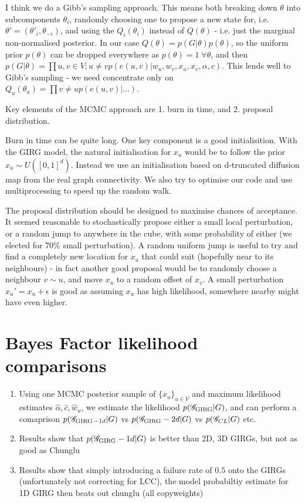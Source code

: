 I think we do a Gibb's sampling approach. This means both breaking down $\theta$ into subcomponents $\theta_i$, randomly choosing one to propose a new state for, i.e. $\theta' = (\theta'_i, \theta_{-i})$, and using the $Q_i(\theta_i)$ instead of $Q(\theta)$ - i.e. just the marginal non-normalised posterior. In our case $Q(\theta) = p(G | \theta) p(\theta)$, so the uniform prior $p(\theta)$ can be dropped everywhere as $p(\theta) = 1\; \forall \theta$, and then $p(G | \theta) = \prod{u, v \in V; u \neq v} p(e(u,v) | w_u, w_v, x_u, x_v, \alpha, c)$. This lends well to Gibb's sampling - we need concentrate only on $Q_u(\theta_u) = \prod{v \neq u} p(e(u,v) | ...)$.

Key elements of the MCMC approach are 1. burn in time, and 2. proposal distribution. 

Burn in time can be quite long. One key component is a good initialisition. With the GIRG model, the natural initialisation for $x_u$ would be to follow the prior $x_u \sim U([0, 1]^d)$. Instead we use an initialisation based on d-truncated diffusion map from the real graph connectivity. We also try to optimise our code and use multiprocessing to speed up the random walk.

The proposal distribution should be designed to maximise chances of acceptance. It seemed reasonable to stochastically propose either a small local perturbation, or a random jump to anywhere in the cube, with some probability of either (we elected for 70\% small perturbation). A random uniform jump is useful to try and find a completely new location for $x_u$ that could suit (hopefully near to its neighbours) - in fact another good proposal would be to randomly choose a neighbour $v \sim u$, and move $x_u$ to a random offset of $x_v$. A small perturbation $x_u' = x_u + \epsilon$ is good as assuming $x_u$ has high likelihood, somewhere nearby might have even higher.


\section{Bayes Factor likelihood comparisons}
\begin{enumerate}
    \item Using one MCMC posterior sample of $\{x_u\}_{u \in V}$ and maximum likelihood estimates $\hat{\alpha}, \hat{c}, \hat{w}_u$, we estimate the likelihood $p(\mathscr{G}_{\operatorname{GIRG}} | G)$, and can perform a comaprison $p(\mathscr{G}_{\operatorname{GIRG}-1d} | G)$ vs $p(\mathscr{G}_{\operatorname{GIRG}}-2d | G)$ vs $p(\mathscr{G}_{CL} | G)$ etc.
    \item Results show that $p(\mathscr{G}_{\operatorname{GIRG}}-1d | G)$ is better than 2D, 3D GIRGs, but not as good as Chunglu
    \item Results show that simply introducing a failure rate of $0.5$ onto the GIRGs (unfortunately not correcting for LCC), the model probabiltiy estimate for 1D GIRG then beats out chunglu (all copyweights)
\end{enumerate}

